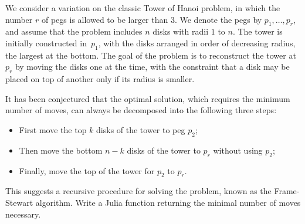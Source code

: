 \begin{task}
    We consider a variation on the classic Tower of Hanoi problem,
    in which the number $r$ of pegs is allowed to be larger than 3.
    We denote the pegs by $p_1, \dots, p_r$,
    and assume that the problem includes $n$ disks with radii $1$ to $n$.
    The tower is initially constructed in~$p_1$,
    with the disks arranged in order of decreasing radius, the largest at the bottom.
    The goal of the problem is to reconstruct the tower at $p_r$ by moving the disks one at the time,
    with the constraint that a disk may be placed on top of another only if its radius is smaller.

    It has been conjectured that the optimal solution,
    which requires the minimum number of moves,
    can always be decomposed into the following three steps:
    \begin{itemize}
        \item First move the top $k$ disks of the tower to peg $p_2$;
        \item Then move the bottom $n-k$ disks of the tower to $p_r$ without using $p_2$;
        \item Finally, move the top of the tower for $p_2$ to $p_r$.
    \end{itemize}
    This suggests a recursive procedure for solving the problem, known as the Frame-Stewart algorithm.
    Write a Julia function  returning the minimal number of moves necessary.

\end{task}


